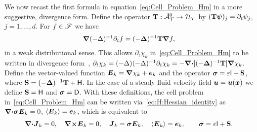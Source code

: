\documentclass[amsa]{ipart}
\begin{document}
We now recast the first formula in equation~\eqref{eq:Cell_Problem_Hm}
in a more suggestive, divergence form. Define the operator
$\mathbf{T}:\tilde{\mathcal{A}}^0_{\mathcal{T}}\to\mathcal{H}_{\mathcal{T}}$ by $(\mathbf{T}\boldsymbol{\psi})_j=\partial_t\psi_j$,
$j=1,\ldots,d$. For $f\in\mathscr{F}$ we
have~\cite{Fannjiang:1994:SIAM_JAM:333,Novikov:2005:CPAM:867,Folland:99:RealAnalysis}     
%
\begin{align}\label{eq:Dt_T}
  \bnabla(-\Delta)^{-1}\partial_t f=(-\bDelta)^{-1}\Tb\bnabla f ,
\end{align}
%
in a weak distributional sense. This allows $\partial_t\chi_k$
in~\eqref{eq:Cell_Problem_Hm} to be written in divergence 
form~\cite{Fannjiang:1994:SIAM_JAM:333,Novikov:2005:CPAM:867},      
$\partial_t\chi_k=(-\Delta)(-\Delta)^{-1}\partial_t\chi_k=-\mbox{\boldmath${\nabla}$}\mbox{\boldmath${\cdot}$}[(-\mbox{\boldmath${\Delta}$})^{-1}\mathbf{T}]\mbox{\boldmath${\nabla}$}
\chi_k$. Define the vector-valued function $\boldsymbol{E}_k=\mbox{\boldmath${\nabla}$} \chi_k+\boldsymbol{e}_k$
and the operator $\mbox{\boldmath${\sigma}$}=\varepsilon\mathsf{I}+\mathbf{S}$, where
$\mathbf{S}=(-\mbox{\boldmath${\Delta}$})^{-1}\mathbf{T}+\mathsf{H}$. In the case of a steady fluid velocity
field $\boldsymbol{u}=\boldsymbol{u}(\boldsymbol{x})$ we define 
$\mathbf{S}=\mathsf{H}$ and $\mbox{\boldmath${\sigma}$}=\mathsf{D}$. With these definitions, the cell problem
in~\eqref{eq:Cell_Problem_Hm} can be written
via~\eqref{eq:H:Hessian_identity} as
$\mbox{\boldmath${\nabla}$}\mbox{\boldmath${\cdot}$}\mbox{\boldmath${\sigma}$}\boldsymbol{E}_k=0$, $\langle\boldsymbol{E}_k\rangle=\boldsymbol{e}_k$, which is
equivalent to 
%
\begin{align}\label{eq:Maxwells_Equations}    
  \bnabla \bcdot\vecJ_k=0, \quad
  \bnabla \btimes\vecE_k=0, \quad
  \vecJ_k=\bsig\vecE_k,\quad
  \langle\vecE_k\rangle=\vece _k,\qquad
  \bsig%
       =\varepsilon\Ib+\Sb.
\end{align}
%
\end{document}
